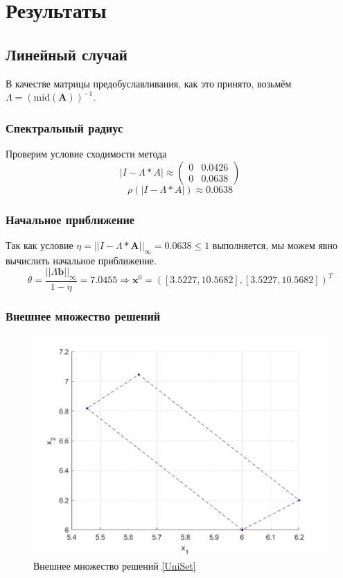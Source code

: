 \section{Результаты}
\subsection{Линейный случай}
В качестве матрицы предобуславливания, как это принято, возьмём $\Lambda=(\mathrm{mid}(\textbf{A}))^{-1}$.\\
\subsubsection{Спектральный радиус}
Проверим условие сходимости метода 
\begin{equation}
    |I-\Lambda*A|\approx
    \begin{pmatrix}
0  &  0.0426 \\
0  &  0.0638
\end{pmatrix}
\end{equation}
\begin{equation}
     \rho(|I-\Lambda*A|)\approx0.0638
\end{equation}
\subsubsection{Начальное приближение}
Так как условие $\eta=||I-\Lambda*\textbf{A}||_\infty=0.0638\leq 1$ выполняется, мы можем явно вычислить начальное приближение.
\begin{equation}
    \theta=\frac{||\Lambda \textbf{b}||_\infty}{1-\eta}=7.0455\Rightarrow \textbf{x}^0=([3.5227, 10.5682], [3.5227,   10.5682])^T
\end{equation}
\subsubsection{Внешнее множество решений}
\begin{figure}[H]
\centering
\includegraphics[width=\textwidth]{Graphics/Linear_area.png}
\caption{Внешнее множество решений \eqref{UniSet}} 
\end{figure}
\newpage
